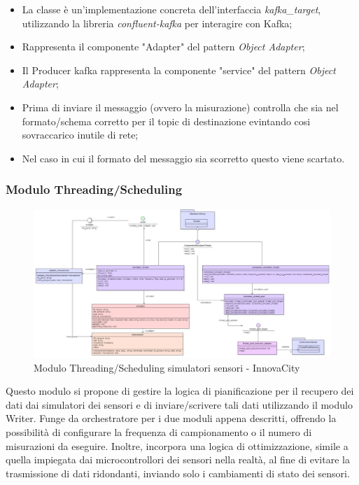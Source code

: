 \begin{itemize}
\begin{itemize}
        \begin{itemize}
            \item La classe è un'implementazione concreta dell'interfaccia \textit{kafka\_target}, utilizzando la libreria \textit{confluent-kafka} per interagire con Kafka;
            \item Rappresenta il componente "Adapter" del pattern \textit{Object Adapter};
            \item Il Producer kafka rappresenta la componente "service" del pattern \textit{Object Adapter};
            \item Prima di inviare il messaggio (ovvero la misurazione) controlla che sia nel formato/schema corretto per il topic di destinazione evintando cosi sovraccarico inutile di rete;
            \item Nel caso in cui il formato del messaggio sia scorretto questo viene scartato.
        \end{itemize}
    \end{itemize}
\end{itemize}

\subsubsection{Modulo Threading/Scheduling}
\begin{figure}[H]
    \centering
    \includegraphics[width=1.1\textwidth]{../Images/SpecificaTecnica/simulatorThread.PNG}
    \caption{Modulo Threading/Scheduling simulatori sensori - InnovaCity}
    \label{fig: Modulo_simulatori_sensori_thread}
\end{figure}
Questo modulo si propone di gestire la logica di pianificazione per il recupero dei dati dai simulatori dei sensori e di inviare/scrivere tali dati utilizzando il modulo Writer. Funge da orchestratore per i due moduli appena descritti, offrendo la possibilità di configurare la frequenza di campionamento o il numero di misurazioni da eseguire. Inoltre, incorpora una logica di ottimizzazione, simile a quella impiegata dai microcontrollori dei sensori nella realtà, al fine di evitare la trasmissione di dati ridondanti, inviando solo i cambiamenti di stato dei sensori.

